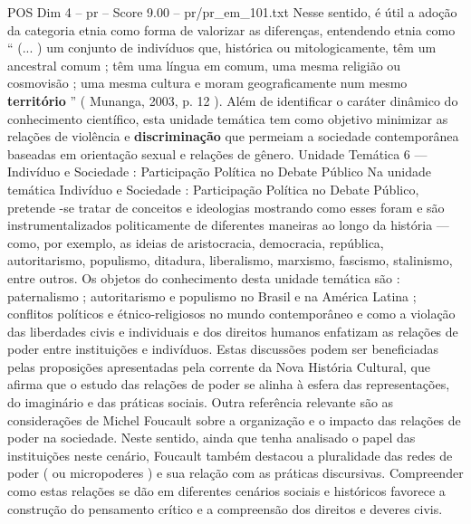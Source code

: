 \begin{textsample}{POS Dim 4 – pr – Score 9.00 – pr/pr\_em\_101.txt}
Nesse sentido, é útil a adoção da categoria etnia como forma de valorizar as diferenças, entendendo etnia como “ (... ) um conjunto de indivíduos que, histórica ou mitologicamente, têm um ancestral comum ; têm uma língua em comum, uma mesma religião ou cosmovisão ; uma mesma cultura e moram geograficamente num mesmo \textbf{território} ” ( Munanga, 2003, p. 12 ).
Além de identificar o caráter dinâmico do conhecimento científico, esta unidade temática tem como objetivo minimizar as relações de violência e \textbf{discriminação} que permeiam a sociedade contemporânea baseadas em orientação sexual e relações de gênero.
Unidade Temática 6 — Indivíduo e Sociedade : Participação Política no Debate Público Na unidade temática Indivíduo e Sociedade : Participação Política no Debate Público, pretende -se tratar de conceitos e ideologias mostrando como esses foram e são instrumentalizados politicamente de diferentes maneiras ao longo da história — como, por exemplo, as ideias de aristocracia, democracia, república, autoritarismo, populismo, ditadura, liberalismo, marxismo, fascismo, stalinismo, entre outros.
Os objetos do conhecimento desta unidade temática são : paternalismo ; autoritarismo e populismo no Brasil e na América Latina ; conflitos políticos e étnico-religiosos no mundo contemporâneo e como a violação das liberdades civis e individuais e dos direitos humanos enfatizam as relações de poder entre instituições e indivíduos.
Estas discussões podem ser beneficiadas pelas proposições apresentadas pela corrente da Nova História Cultural, que afirma que o estudo das relações de poder se alinha à esfera das representações, do imaginário e das práticas sociais.
Outra referência relevante são as considerações de Michel Foucault sobre a organização e o impacto das relações de poder na sociedade.
Neste sentido, ainda que tenha analisado o papel das instituições neste cenário, Foucault também destacou a pluralidade das redes de poder ( ou micropoderes ) e sua relação com as práticas discursivas.
Compreender como estas relações se dão em diferentes cenários sociais e históricos favorece a construção do pensamento crítico e a compreensão dos direitos e deveres civis.

\end{textsample}
